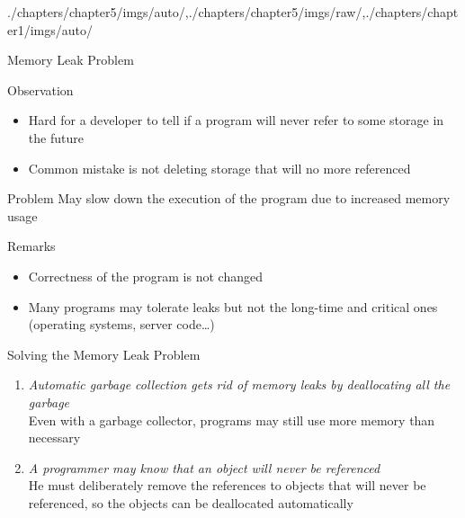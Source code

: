 \begin{graphicspathcontext}{{./chapters/chapter5/imgs/auto/},{./chapters/chapter5/imgs/raw/},{./chapters/chapter1/imgs/auto/}}
\begin{bibunit}[apalike]
\begin{frame}{{Memory Leak} Problem}
	\begin{small}
		\begin{block}{Observation}
			\begin{itemize}
				\item Hard for a developer to tell if a program will never refer to some storage in the future
				\item Common mistake is not deleting storage that will no more referenced
			\end{itemize}
		\end{block}
		\vspace{.25cm}
		\begin{alertblock}{Problem}
			May slow down the execution of the program due to increased memory usage
		\end{alertblock}
		\vspace{.25cm}
		\begin{block}{Remarks}
			\begin{itemize}
				\item Correctness of the program is not changed
				\item Many programs may tolerate leaks but not the long-time and critical ones (operating systems, server code\dots)
			\end{itemize}
		\end{block}
	\end{small}
\end{frame}

\begin{frame}[background=6]{Solving the Memory Leak Problem}
	\begin{enumerate}
		\item \emph{Automatic garbage collection gets rid of memory leaks by deallocating all the garbage}\\
		Even with a garbage collector, programs may still use more memory than necessary
		\vspace{1cm}
		\item \emph{A programmer may know that an object will never be referenced} \\
		He must deliberately remove the references to objects that will never be referenced, so the objects can be deallocated automatically
	\end{enumerate}
\end{frame}


\end{bibunit}
\end{graphicspathcontext}
